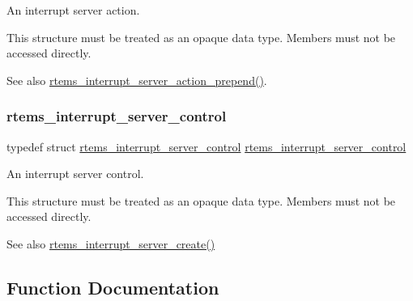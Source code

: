 An interrupt server action. 

This structure must be treated as an opaque data type. Members must not be accessed directly.

\begin{DoxySeeAlso}{See also}
\mbox{\hyperlink{group__rtems__interrupt__extension_ga734c36a08deae3d40775f46e526526be}{rtems\+\_\+interrupt\+\_\+server\+\_\+action\+\_\+prepend()}}. 
\end{DoxySeeAlso}
\mbox{\label{group__rtems__interrupt__extension_ga25f7b3fd5fce7a851fe2f12f8943a0ff}} 
\subsubsection{\texorpdfstring{rtems\_interrupt\_server\_control}{rtems\_interrupt\_server\_control}}
{\footnotesize\ttfamily typedef struct \mbox{\hyperlink{structrtems__interrupt__server__control}{rtems\+\_\+interrupt\+\_\+server\+\_\+control}}  \mbox{\hyperlink{structrtems__interrupt__server__control}{rtems\+\_\+interrupt\+\_\+server\+\_\+control}}}



An interrupt server control. 

This structure must be treated as an opaque data type. Members must not be accessed directly.

\begin{DoxySeeAlso}{See also}
\mbox{\hyperlink{group__rtems__interrupt__extension_gad7725dd729bfd34f36c0de4d9c326abc}{rtems\+\_\+interrupt\+\_\+server\+\_\+create()}} 
\end{DoxySeeAlso}


\subsection{Function Documentation}
\mbox{\label{group__rtems__interrupt__extension_gaf99a316611a290b2e58d9caf48594838}} 
